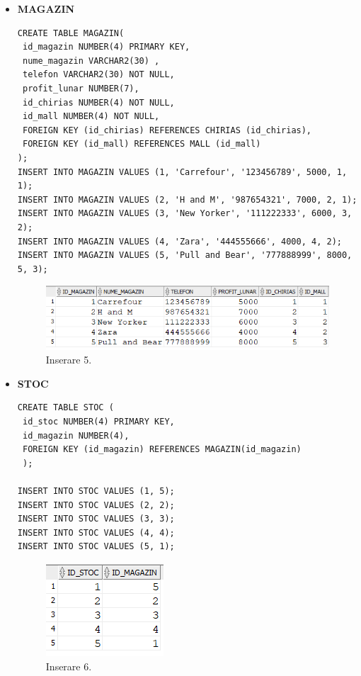 \begin{itemize}
    \item \textbf{MAGAZIN}
    \vspace{0.2cm}
    \begin{lstlisting}
CREATE TABLE MAGAZIN(
 id_magazin NUMBER(4) PRIMARY KEY,
 nume_magazin VARCHAR2(30) ,
 telefon VARCHAR2(30) NOT NULL,
 profit_lunar NUMBER(7),
 id_chirias NUMBER(4) NOT NULL,
 id_mall NUMBER(4) NOT NULL,
 FOREIGN KEY (id_chirias) REFERENCES CHIRIAS (id_chirias),
 FOREIGN KEY (id_mall) REFERENCES MALL (id_mall)
);
INSERT INTO MAGAZIN VALUES (1, 'Carrefour', '123456789', 5000, 1, 1);
INSERT INTO MAGAZIN VALUES (2, 'H and M', '987654321', 7000, 2, 1);
INSERT INTO MAGAZIN VALUES (3, 'New Yorker', '111222333', 6000, 3, 2);
INSERT INTO MAGAZIN VALUES (4, 'Zara', '444555666', 4000, 4, 2);
INSERT INTO MAGAZIN VALUES (5, 'Pull and Bear', '777888999', 8000, 5, 3);
    \end{lstlisting}
    \vspace{0.2cm}
    \begin{figure}[h]
      \centerline{\includegraphics{images/inserare5.png}}
      \caption{ Inserare 5.}
    \end{figure}
    \vspace{0.5cm}

    \item \textbf{STOC}
    \vspace{0.2cm}
    \begin{lstlisting}
CREATE TABLE STOC (
 id_stoc NUMBER(4) PRIMARY KEY,
 id_magazin NUMBER(4),
 FOREIGN KEY (id_magazin) REFERENCES MAGAZIN(id_magazin)
 );

INSERT INTO STOC VALUES (1, 5);
INSERT INTO STOC VALUES (2, 2);
INSERT INTO STOC VALUES (3, 3);
INSERT INTO STOC VALUES (4, 4);
INSERT INTO STOC VALUES (5, 1);
    \end{lstlisting}
    \vspace{4cm}
    \begin{figure}[h]
      \centerline{\includegraphics{images/inserare6.png}}
      \caption{ Inserare 6.}
    \end{figure}
    \vspace{0.5cm}


\end{itemize}
